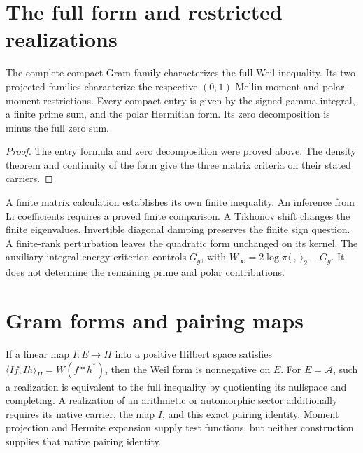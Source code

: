 \section{The full form and restricted realizations}
\label{v4-arith:w7-h:irreducible}
\begin{theorem}
\label{v4-arith:w7-h:thm:ceiling}
The complete compact Gram family characterizes the full Weil inequality.
Its two projected families characterize the respective $(0,1)$ Mellin
moment and polar-moment restrictions.
Every compact entry is given by the signed gamma integral, a finite
prime sum, and the polar Hermitian form.
Its zero decomposition is minus the full zero sum.
\end{theorem}
\begin{proof}
The entry formula and zero decomposition were proved above.
The density theorem and continuity of the form give the three
matrix criteria on their stated carriers.
\end{proof}
\begin{remark}
\label{v4-arith:w7-h:rem:honest-form}
\label{v4-arith:w7-h:rem:compare-w6}
A finite matrix calculation establishes its own finite inequality.
An inference from Li coefficients requires a proved finite comparison.
A Tikhonov shift changes the finite eigenvalues. Invertible diagonal
damping preserves the finite sign question. A finite-rank perturbation
leaves the quadratic form unchanged on its kernel.
The auxiliary integral-energy criterion controls $G_g$, with
$W_\infty=2\log\pi\langle\ ,\ \rangle_2-G_g$.
It does not determine the remaining prime and polar contributions.
\end{remark}
\section{Gram forms and pairing maps}
\label{v4-arith:w7-h:summary}
\begin{remark}
\label{v4-arith:w7-h:rem:beilinson}
If a linear map $I:E\to H$ into a positive Hilbert space satisfies
$\langle If,Ih\rangle_H=W(f*h^*)$, then the Weil form is nonnegative
on $E$. For $E=\mathscr A$, such a realization is equivalent to the
full inequality by quotienting its nullspace and completing.
A realization of an arithmetic or automorphic sector additionally
requires its native carrier, the map $I$, and this exact pairing identity.
Moment projection and Hermite expansion supply test functions, but
neither construction supplies that native pairing identity.
\end{remark}

